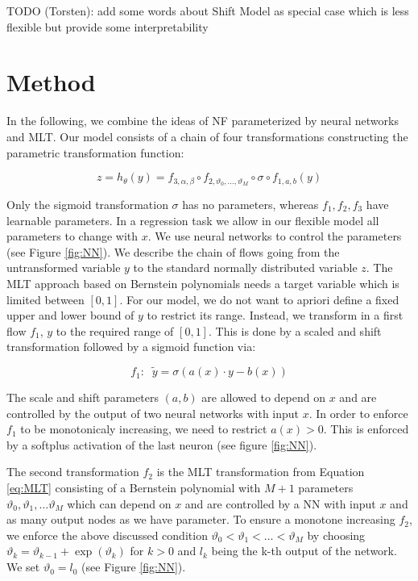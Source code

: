 \documentclass[a4paper,conference]{IEEEtran}
\begin{document}
TODO (Torsten): add some words about Shift Model as special case which is less flexible but provide some interpretability


\section{Method}
In the following, we combine the ideas of NF parameterized by neural networks and MLT. 
Our model consists of a chain of four transformations constructing the parametric transformation function:

\begin{equation}
\label{eq:MLT}
    z = h_\theta(y) = f_{3, \alpha, \beta } \circ f_{2, \vartheta_0, \ldots, \vartheta_M} \circ \sigma \circ f_{1, a, b}(y)
\end{equation}

Only the sigmoid transformation $\sigma$ has no parameters, whereas $ f_1, f_2, f_3$ have learnable parameters. In a regression task we allow in our flexible model all parameters to change with $x$. We use neural networks to control the parameters (see Figure \ref{fig:NN}). We describe the chain of flows going from the untransformed variable $y$ to the standard normally distributed variable $z$. The MLT approach based on Bernstein polynomials needs a target variable which is limited between $[0,1]$. For our model, we do not want to apriori define a fixed upper and lower bound of $y$ to restrict its range. Instead, we transform in a first flow $f_1$, $y$ to the required range of $[0,1]$. This is done by a scaled and shift transformation followed by a sigmoid function via:

\begin{equation}
    f_1: \;\; \tilde{y} = \sigma(a(x) \cdot y - b(x))
\end{equation}

The scale and shift parameters $(a, b)$ are allowed to depend on $x$ and are controlled by the output of two neural networks with input $x$. In order to enforce $f_1$ to be monotonicaly increasing, we need to restrict  $a(x) > 0$. This is enforced by a softplus activation of the last neuron (see figure \ref{fig:NN}). 

The second transformation $f_2$ is the MLT transformation from Equation \ref{eq:MLT} consisting of a Bernstein polynomial with $M+1$ parameters  $\vartheta_0 , \vartheta_1,\ldots \vartheta_M$  which can depend on $x$ and are controlled by a NN with input $x$ and as many output nodes as we have parameter. To ensure a monotone increasing $f_2$, we enforce the above discussed condition $\vartheta_0 < \vartheta_1 < \ldots < \vartheta_M$ by choosing $\vartheta_k=\vartheta_{k-1} + \exp(\vartheta_k)$ for $k>0$ and $l_k$ being the k-th output of the network. We set $\vartheta_0=l_0$ (see Figure \ref{fig:NN}).
\end{document}
